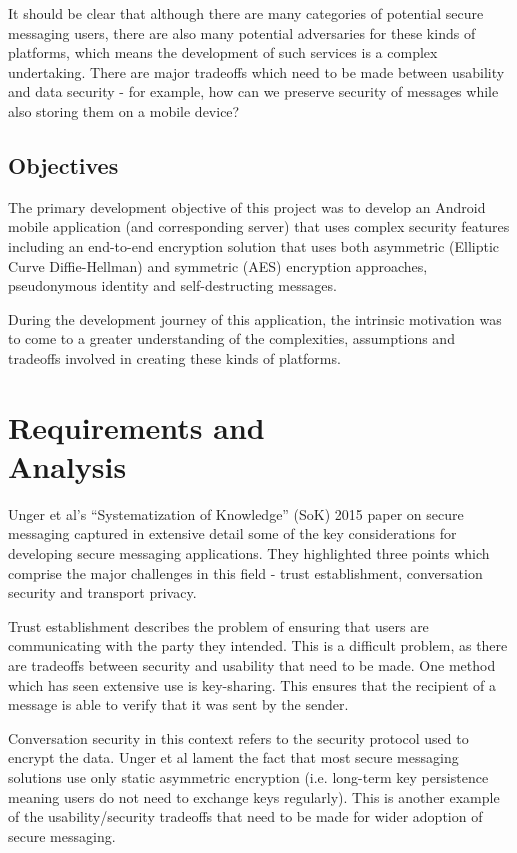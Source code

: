 \documentclass{mproj}
\begin{document}
It should be clear that although there are many categories of potential secure messaging users, there are also many potential adversaries for these kinds of platforms, which means the development of such services is a complex undertaking. There are major tradeoffs which need to be made between usability and data security - for example, how can we preserve security of messages while also storing them on a mobile device? 

\section{Objectives}
The primary development objective of this project was to develop an Android mobile application (and corresponding server) that uses complex security features including an end-to-end encryption solution that uses both asymmetric (Elliptic Curve Diffie-Hellman) and symmetric (AES) encryption approaches, pseudonymous identity and self-destructing messages. 

During the development journey of this application, the intrinsic motivation was to come to a greater understanding of the complexities, assumptions and tradeoffs involved in creating these kinds of platforms. 

\chapter{Requirements and \\ Analysis}\label{analysis}
Unger et al's ``Systematization of Knowledge'' (SoK) 2015 paper on secure messaging captured in extensive detail some of the key considerations for developing secure messaging applications. They highlighted three points which comprise the major challenges in this field - trust establishment, conversation security and transport privacy.

Trust establishment describes the problem of ensuring that users are communicating with the party they intended. This is a difficult problem, as there are tradeoffs between security and usability that need to be made. One method which has seen extensive use is key-sharing. This ensures that the recipient of a message is able to verify that it was sent by the sender.

Conversation security in this context refers to the security protocol used to encrypt the data. Unger et al lament the fact that most secure messaging solutions use only static asymmetric encryption (i.e. long-term key persistence meaning users do not need to exchange keys regularly). This is another example of the usability/security tradeoffs that need to be made for wider adoption of secure messaging.
\end{document}
